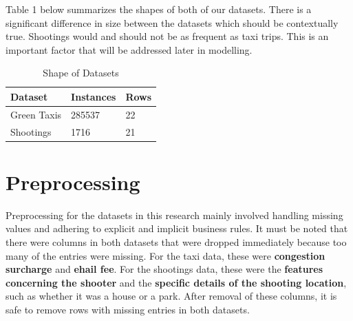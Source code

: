 \documentclass[11pt]{article}
\begin{document}
Table 1 below summarizes the shapes of both of our datasets. There is a significant difference in size between the datasets which should be contextually true. Shootings would and should not be as frequent as taxi trips. This is an important factor that will be addressed later in modelling.
\begin{table}[h]
	\begin{center}
		\begin{tabular}{|l|l|l|}			
			\hline
			Dataset & Instances & Rows\\
			\hline\hline
                Green Taxis & 285537 & 22 \\
			Shootings & 1716 &21\\
			\hline
		\end{tabular}
		\caption{Shape of Datasets}
		\label{table1}
	\end{center}
\end{table}

\section{Preprocessing}

Preprocessing for the datasets in this research mainly involved handling missing values and adhering to explicit and implicit business rules. It must be noted that there were columns in both datasets that were dropped immediately because too many of the entries were missing. For the taxi data, these were \textbf{congestion surcharge} and \textbf{ehail fee}. For the shootings data, these were the \textbf{features concerning the shooter} and the \textbf{specific details of the shooting location}, such as whether it was a house or a park. After removal of these columns, it is safe to remove rows with missing entries in both datasets.
\end{document}

